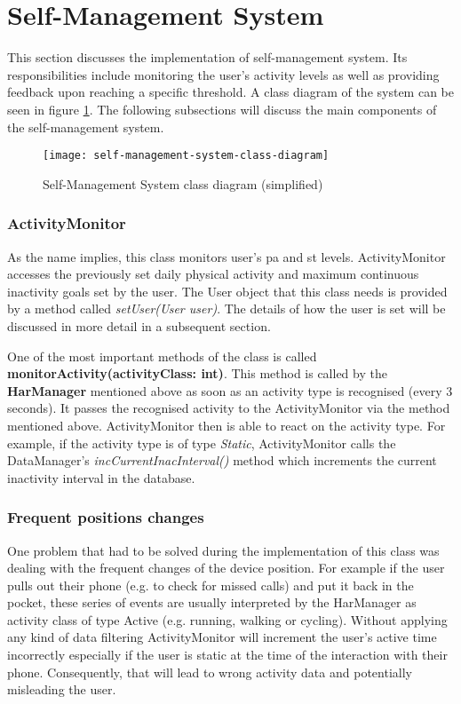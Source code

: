         
\section{Self-Management System}
This section discusses the implementation of self-management system. Its responsibilities include monitoring the user's activity levels as well as providing feedback upon reaching a specific threshold. A class diagram of the system can be seen in figure \ref{fig:self_management_system}. The following subsections will discuss the main components of the self-management system. 

\begin{figure}[ht]
    \centering
    \texttt{[image: self-management-system-class-diagram]}
    \caption{Self-Management System class diagram (simplified)}
    \label{fig:self_management_system}
\end{figure}

    \subsubsection{ActivityMonitor}
    As the name implies, this class monitors user's \gls{pa} and \gls{st} levels. ActivityMonitor accesses the previously set daily physical activity and maximum continuous inactivity goals set by the user. The User object that this class needs is provided by a method called \textit{setUser(User user)}. The details of how the user is set will be discussed in more detail in a subsequent section.
    
    One of the most important methods of the class is called \textbf{monitorActivity(activityClass: int)}. This method is called by the \textbf{HarManager} mentioned above as soon as an activity type is recognised (every 3 seconds). It passes the recognised activity to the ActivityMonitor via the method mentioned above. ActivityMonitor then is able to react on the activity type. For example, if the activity type is of type \textit{Static}, ActivityMonitor calls the DataManager's \textit{incCurrentInacInterval()} method which increments the current inactivity interval in the database.
    
    \subsubsection{Frequent positions changes}
    One problem that had to be solved during the implementation of this class was dealing with the frequent changes of the device position. For example if the user pulls out their phone (e.g. to check for missed calls) and put it back in the pocket, these series of events are usually interpreted by the HarManager as activity class of type Active (e.g. running, walking or cycling). Without applying any kind of data filtering ActivityMonitor will increment the user's active time incorrectly especially if the user is static at the time of the interaction with their phone. Consequently, that will lead to wrong activity data and potentially misleading the user.
    
